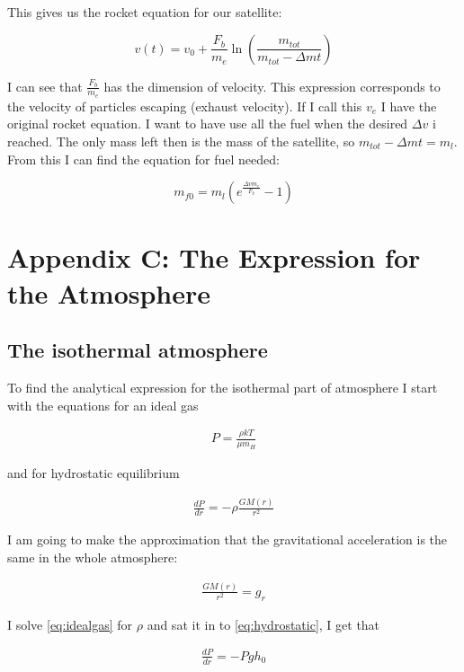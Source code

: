 \documentclass[a4paper, 10pt]{article}
\begin{document}
This gives us the rocket equation for our satellite: 

\begin{equation}
v(t) =v_0 + \frac{F_b}{m_e} \ln \left(\frac{m_{tot}}{m_{tot} - \Delta m t} \right)
\end{equation}

I can see that $\frac{F_b}{m_e}$ has the dimension of velocity. This expression corresponds to the velocity of particles escaping (exhaust velocity). If I call this $v_e$ I have the original rocket equation. I want to have use all the fuel when the desired $\Delta v$ i reached. The only mass left then is the mass of the satellite, so $m_{tot} - \Delta m t = m_l$. From this I can find the equation for fuel needed:

\begin{equation}
m_{f0} = m_l(e^{\frac{\Delta v m_e}{F_b}} - 1)
\end{equation}


\section{Appendix C: The Expression for the Atmosphere}\label{sec:atmosphere}
\subsection{The isothermal atmosphere}
To find the analytical expression for the isothermal part of atmosphere I start with the equations for an ideal gas \cite{1e}

\begin{align}\label{eq:idealgas}
P = \frac{\rho kT}{\mu m_H}
\end{align}

and for hydrostatic equilibrium 

\begin{align}\label{eq:hydrostatic}
\frac{dP}{dr} = -\rho \frac{GM(r)}{r^2}
\end{align}

I am going to make the approximation that the gravitational acceleration is the same in the whole atmosphere:

\begin{align}
\frac{GM(r)}{r^2} = g_r
\end{align}

I solve \ref{eq:idealgas} for $\rho$ and sat it in to \ref{eq:hydrostatic}, I get that

\begin{align}
\frac{dP}{dr} = -Pg h_0
\end{align}
\end{document}
